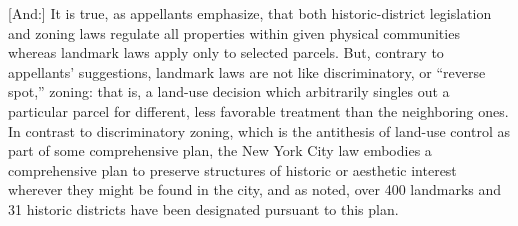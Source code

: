 %

[And:]
It is true, as appellants emphasize, that both historic-district legislation and
zoning laws regulate all properties within given physical communities whereas
landmark laws apply only to selected parcels. But, contrary to appellants'
suggestions, landmark laws are not like discriminatory, or ``reverse spot,''
zoning: that is, a land-use decision which arbitrarily singles out a particular
parcel for different, less favorable treatment than the neighboring ones. In
contrast to discriminatory zoning, which is the antithesis of land-use control
as part of some comprehensive plan, the New York City law embodies a
comprehensive plan to preserve structures of historic or aesthetic interest
wherever they might be found in the city, and as noted, over 400 landmarks and
31 historic districts have been designated pursuant to this plan.

